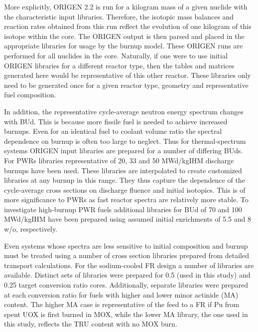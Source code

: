 More explicitly, ORIGEN 2.2 is run for a kilogram mass of a given nuclide with the characteristic 
input libraries.  Therefore, the isotopic mass balances and reaction rates obtained from this run 
reflect the evolution of one kilogram of this isotope within the core.  The ORIGEN output is then 
parsed and placed in the appropriate libraries for usage by the burnup model.  These ORIGEN runs are 
performed for all nuclides in the core.  Naturally, if one were to use initial ORIGEN libraries for a 
different reactor type, then the tables and matrices generated here would be representative of this 
other reactor.  These libraries only need to be generated once for a given reactor type, geometry 
and representative fuel composition.

In addition, the representative cycle-average neutron energy spectrum changes with BUd.  This is because 
more fissile fuel is needed to achieve increased burnups.  Even for an identical fuel to coolant volume 
ratio the spectral dependence on burnup is often too large to neglect.  Thus for thermal-spectrum systems 
ORIGEN input libraries are prepared for a number of differing BUds.  For PWRs libraries 
representative of 20, 33 and 50 MWd/kgIHM discharge burnups have been used.  These 
libraries are interpolated to create customized libraries at any burnup in this range.  They thus 
capture the dependence of the cycle-average cross sections on discharge fluence and
initial isotopics.  This is of more significance to PWRs as fast reactor spectra are relatively more 
stable. To investigate high-burnup PWR fuels additional libraries for BUd of 70 and 100 MWd/kgIHM 
have been prepared using assumed initial  enrichments of 5.5 and 8 w/o, respectively.

Even systems whose spectra are less sensitive to initial composition and burnup must be treated using a 
number of cross section libraries prepared from detailed transport calculations.  For the sodium-cooled 
FR design a number of libraries are available.  
Distinct sets of libraries were prepared for 0.5 (used in this study) and 0.25 target 
conversion ratio cores.  Additionally, separate libraries were prepared at each conversion ratio for 
fuels with higher and lower minor actinide (MA) content.   The higher MA case is representative of the 
feed to a FR if Pu from spent UOX is first burned in MOX, while the lower MA library, the one used in 
this study, reflects the TRU content with no MOX burn.



